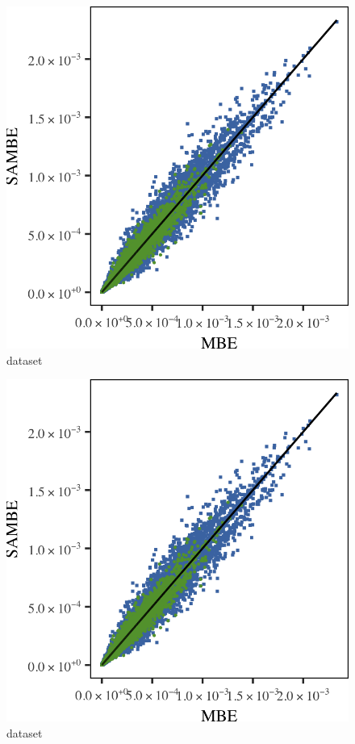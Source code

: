
\begin{subfigure}{0.23\textwidth}
	\centering
	\includegraphics[keepaspectratio=true, width=\textwidth, height=0.23\textheight]{discussion/img/baakman_1_60000_mbe_sambe}
	\caption{dataset \ferdosiOne}
	\label{fig:discussion:singlesphere:mbevssambe:ferdosi1}
\end{subfigure}
\begin{subfigure}{0.23\textwidth}
	\centering
	\includegraphics[keepaspectratio=true, width=\textwidth, height=0.23\textheight]{discussion/img/baakman_1_60000_mbe_sambe}
	\caption{dataset \baakmanOne}
	\label{fig:discussion:singlesphere:mbevssambe:baakman1}
\end{subfigure}
